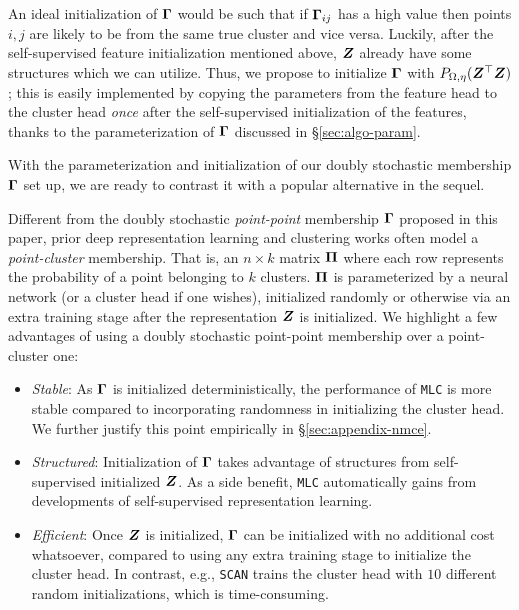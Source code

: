 \documentclass[10pt,twocolumn,letterpaper]{article}
\newcommand{\ours}{MLC}
\newcommand{\mours}{\texttt{\ours}}
\begin{document}
   
   
    An ideal initialization of $\boldsymbol{\Gamma}$ would be such that if $\boldsymbol{\Gamma}_{ij}$ has a high value then points $i, j$ are likely to be from the same true cluster and vice versa. Luckily, after the self-supervised feature initialization mentioned above, ${\bm{Z}}$ already have some structures which we can utilize. Thus, we propose to initialize $\boldsymbol{\Gamma}$ with $P_{\Omega, \eta}({\bm{Z}}^\top {\bm{Z}})$; this is easily implemented by copying the parameters from the feature head to the cluster head \textit{once} after the self-supervised initialization of the features, thanks to the parameterization of $\boldsymbol{\Gamma}$ discussed in \S \ref{sec:algo-param}. 

   With the parameterization and initialization of our doubly stochastic membership $\boldsymbol{\Gamma}$ set up, we are ready to contrast it with a popular alternative in the sequel.

   Different from the doubly stochastic \textit{point-point} membership $\boldsymbol{\Gamma}$ proposed in this paper, prior deep representation learning and clustering works \cite{Van_Gansbeke2020-eo,Li2022-vq,Niu2022-iq} often model a \textit{point-cluster} membership. That is, an $n\times k$ matrix $\boldsymbol{\Pi}$ where each row represents the probability of a point belonging to $k$ clusters. $\boldsymbol{\Pi}$ is parameterized by a neural network (or a cluster head if one wishes), initialized randomly or otherwise via an extra training stage after the representation ${\bm{Z}}$ is initialized. We highlight a few advantages of using a doubly stochastic point-point membership over a point-cluster one: 
   \begin{itemize}[wide,parsep=0pt,topsep=0pt]
    \item \textit{Stable}: As $\boldsymbol{\Gamma}$ is initialized deterministically, the performance of \mours{} is more stable compared to incorporating randomness in initializing the cluster head. We further justify this point empirically in \S \ref{sec:appendix-nmce}.
    \item \textit{Structured}: Initialization of $\boldsymbol{\Gamma}$ takes advantage of structures from self-supervised initialized ${\bm{Z}}$. As a side benefit, \mours{} automatically gains from developments of self-supervised representation learning.
    \item \textit{Efficient}: Once ${\bm{Z}}$ is initialized, $\boldsymbol{\Gamma}$ can be initialized with no additional cost whatsoever, compared to using any extra training stage to initialize the cluster head. In contrast, e.g., \texttt{SCAN} \cite{Van_Gansbeke2020-eo} trains the cluster head with $10$ different random initializations, which is time-consuming.
   \end{itemize}
   
\end{document}
